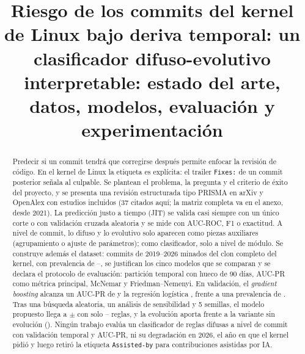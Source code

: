 \documentclass[conference,letterpaper]{IEEEtran}
\begin{document}
\title{Riesgo de los commits del kernel de Linux bajo deriva temporal: un clasificador difuso-evolutivo interpretable: estado del arte, datos, modelos, evaluación y experimentación}

\author{
}

\maketitle

\begin{abstract}
Predecir si un commit tendrá que corregirse después permite enfocar la revisión de código. En el kernel de Linux la etiqueta es explícita: el trailer \texttt{Fixes:} de un commit posterior señala al culpable. Se plantean el problema, la pregunta y el criterio de éxito del proyecto, y se presenta una revisión estructurada tipo PRISMA en arXiv y OpenAlex con \nTotalIncluidos{} estudios incluidos (37 citados aquí; la matriz completa va en el anexo, \nRecientes{} desde 2021). La predicción justo a tiempo (JIT) se valida casi siempre con un único corte o con validación cruzada aleatoria y se mide con AUC-ROC, F1 o exactitud. A nivel de commit, lo difuso y lo evolutivo solo aparecen como piezas auxiliares (agrupamiento o ajuste de parámetros); como clasificador, solo a nivel de módulo. Se construye además el dataset: \cifCommits{} commits de 2019--2026 minados del clon completo del kernel, con prevalencia de \cifPrevMin{}--\cifPrevMax{}, se justifican los cinco modelos que se comparan y se declara el protocolo de evaluación: partición temporal con hueco de 90 días, AUC-PR como métrica principal, McNemar y Friedman--Nemenyi. En validación, el \emph{gradient boosting} alcanza un AUC-PR de \cifValGB{} y la regresión logística \cifValLogistica{}, frente a una prevalencia de \cifValMayoritaria{}. Tras una búsqueda aleatoria, un análisis de sensibilidad y 5 semillas, el modelo propuesto llega a \cifValFE{} $\pm$ \cifValFEde{} con solo \cifReglasMin{}--\cifReglasMax{} reglas, y la evolución aporta frente a la variante sin evolución (\cifValVariante{}). Ningún trabajo evalúa un clasificador de reglas difusas a nivel de commit con validación temporal y AUC-PR, ni su degradación en 2026, el año en que el kernel pidió y luego retiró la etiqueta \texttt{Assisted-by} para contribuciones asistidas por IA.
\end{abstract}
\end{document}
